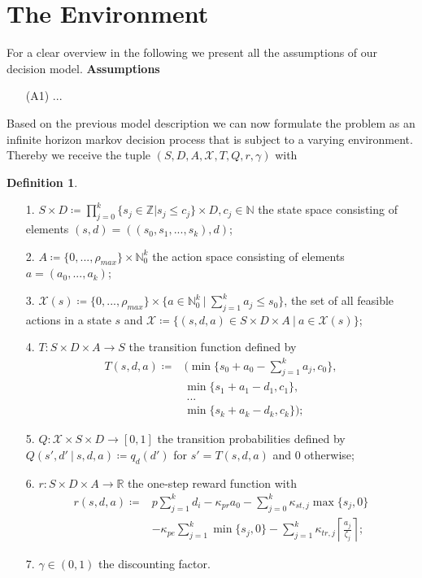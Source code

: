 \documentclass[journal, a4paper]{IEEEtran}
\theoremstyle{plain}
\theoremstyle{definition}
\newtheorem{defn}[thm]{Definition}
\begin{document}
\section{The Environment}
For a clear overview in the following we present all the assumptions of our decision model.
\textbf{Assumptions}
\begin{itemize}
	\item[(A1)] ...
\end{itemize}
Based on the previous model description we can now formulate the problem as an infinite horizon markov decision process that is subject to a varying environment. Thereby we receive the tuple $(S, D, A, \mathcal{X}, T, Q, r, \gamma)$ with
\begin{defn} \label{def:modell} \
	\begin{itemize}
		\item[1.] $S \times D \coloneqq \prod\limits_{j=0}^{k} \{s_j \in \mathbb{Z} | s_j \leq c_j\} \times D, c_j \in \mathbb{N}$ the state space consisting of elements $(s,d) = ((s_0, s_1, ... , s_k), d)$;
		\item[2.] $ A \coloneqq  \{0, ..., \rho_{max} \} \times \mathbb{N}_0^k$ the action space consisting of elements $a = (a_0, ..., a_k)$;
		\item[3.] $ \mathcal{X} (s) \coloneqq \{0, ..., \rho_{max} \} \times \{a \in \mathbb{N}_0^k \ | \ \sum_{j=1}^{k}a_j \leq s_0  \}$, the set of all feasible actions in a state $s$ and $\mathcal{X} \coloneqq \{(s, d , a) \in S \times D \times A \ | \ a \in \mathcal{X} (s)\}$;
		\item[4.] $ T: S \times D \times A \rightarrow S$ the transition function defined by
			\begin{equation*}
				\begin{split}
					T(s, d, a) \coloneqq &(\min\{s_0 + a_0 - \sum_{j=1}^{k}a_j, c_0 \}, \\
					&\min\{s_1 + a_1 - d_1, c_1 \}, \\
					&\ ... \\
					&\min\{s_k + a_k - d_k, c_k \});
				\end{split}
			\end{equation*}
		\item[5.] $ Q: \mathcal{X} \times S \times D \rightarrow [0,1]  $ the transition probabilities defined by $Q(s', d'\ |\ s, d, a) \coloneqq q_d(d')$ for $s' = T(s, d, a)$ and $0$ otherwise;
		\item[6.] $ r: S \times D \times A \rightarrow \mathbb{R} $ the one-step reward function with 
			\begin{equation*}
				\begin{split}
					r(s, d, a) \coloneqq &p \sum_{j=1}^{k}d_i - \kappa_{pr} a_0 - \sum_{j=0}^{k} \kappa_{st, j} \max\{s_j, 0\} \\ 
					&-\kappa_{pe} \sum_{j=1}^{k}\min\{s_j, 0\} - \sum_{j=1}^{k} \kappa_{tr, j} \left\lceil \frac{a_j}{\zeta_j} \right\rceil;
				\end{split}
			\end{equation*}
		\item[7.] $\gamma \in (0, 1) $ the discounting factor.
	\end{itemize}
\end{defn}
\end{document}
